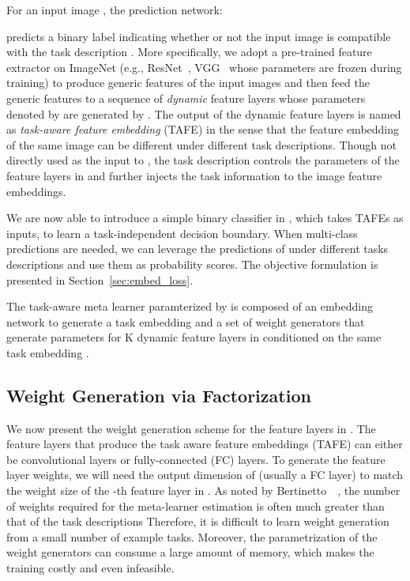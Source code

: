\documentclass[10pt,twocolumn,letterpaper]{article}
\begin{document}
For an input image , the prediction network:

predicts a binary label  indicating whether or not the input image  is compatible with 
the task description . More specifically, we adopt a pre-trained feature extractor on ImageNet (e.g., ResNet~\cite{he2016deep}, VGG~\cite{simonyan2014very} whose parameters are frozen during training) to produce generic features of the input images and then feed the generic features to a sequence of \emph{dynamic}
feature layers whose parameters denoted by  are generated by .  The output of the dynamic feature layers is named 
as \emph{task-aware feature embedding} (TAFE) in the sense that the feature embedding 
of the same image can be different under different task descriptions. Though not directly used as the input to ,
the task description  controls the parameters of the feature layers in  and further injects the task information to the
image feature embeddings. 

We are now able to introduce a simple binary classifier in , which takes TAFEs as inputs,  
to learn a task-independent decision boundary. When multi-class predictions are needed, we can leverage the predictions of  under different tasks descriptions and use them as probability scores. The objective formulation is presented in Section~\ref{sec:embed_loss}. 


The task-aware meta learner  paramterized by  is composed of an embedding network 
 to generate a task embedding  and a set of
weight generators  that generate parameters for K dynamic feature
layers in  conditioned on the same task embedding .  

\subsection{Weight Generation via Factorization}
\label{sec:weight_factorization}
We now present the weight generation scheme for the feature layers in 
. The feature layers that produce the task aware feature embeddings (TAFE) can either be convolutional layers or fully-connected (FC) layers. To generate the feature layer weights,  we will need the output dimension of  (usually a FC layer) to match the weight size of the -th feature layer in . As noted by Bertinetto~\etal~\cite{bertinetto2016learning}, the 
number of weights required for the meta-learner estimation is often much greater than that of the task descriptions Therefore, it is difficult to learn weight generation from a small number of example tasks. Moreover, the parametrization of the weight generators  can consume a large amount 
of memory, which makes the training costly and even infeasible. 
\end{document}
